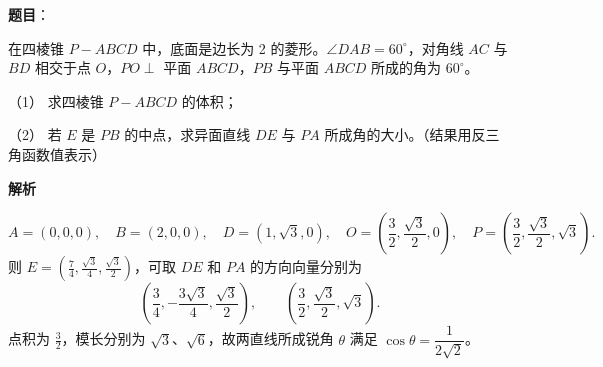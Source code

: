 \begin{answer}

\textbf{题目}：

在四棱锥 $P-ABCD$ 中，底面是边长为 2 的菱形。$\angle DAB=60^\circ$，对角线 $AC$ 与 $BD$ 相交于点 $O$，$PO\perp$ 平面 $ABCD$，$PB$ 与平面 $ABCD$ 所成的角为 $60^\circ$。

（1） 求四棱锥 $P-ABCD$ 的体积；

（2） 若 $E$ 是 $PB$ 的中点，求异面直线 $DE$ 与 $PA$ 所成角的大小。（结果用反三角函数值表示）
\nopagebreak[4]
\begin{center}\end{center}
\nopagebreak[4]
\textbf{解析}


\nopagebreak[4]
\[
A=(0,0,0),\quad B=(2,0,0),\quad D=(1,\sqrt3,0),\quad
O=\left(\frac32,\frac{\sqrt3}2,0\right),\quad
P=\left(\frac32,\frac{\sqrt3}2,\sqrt3\right).
\]
则 $E=(\frac74,\frac{\sqrt3}4,\frac{\sqrt3}2)$，可取 $DE$ 和 $PA$ 的方向向量分别为
\nopagebreak[4]
\[
\left(\frac34,-\frac{3\sqrt3}4,\frac{\sqrt3}2\right),\qquad
\left(\frac32,\frac{\sqrt3}2,\sqrt3\right).
\]
点积为 $\frac32$，模长分别为 $\sqrt3$、$\sqrt6$，故两直线所成锐角 $\theta$ 满足 $\cos\theta=\dfrac{1}{2\sqrt2}$。



\end{answer}
